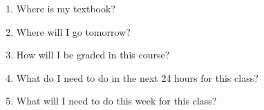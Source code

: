 \documentclass[11pt,fleqn]{article}
\begin{document}
\begin{enumerate}
\vfill
\item Where is my textbook?\\
\vfill
\item Where will I go tomorrow?
\vfill
\item How will I be graded in this course? \\
\vfill
\item What do I need to do in the next 24 hours for this class?\\
\vfill
\item What will I need to do this week for this class?\\
\vfill



\end{enumerate}
\end{document}

